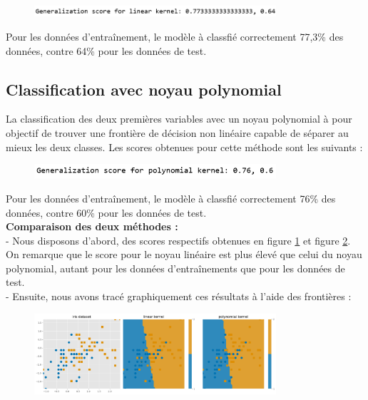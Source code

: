 \documentclass[a4paper,12pt]{article}
\begin{document}
\begin{figure}[h!]
    \centering
    \includegraphics[width=0.8\textwidth]{Images/linear_score.png}
    \caption{}
    \label{fig:linear}
\end{figure}

Pour les données d'entraînement, le modèle à classfié correctement 77,3\% des données, contre 64\% pour les données de test. 


\subsection{Classification avec noyau polynomial}

La classification des deux premières variables avec un noyau polynomial à pour objectif de trouver une frontière de décision non linéaire capable de séparer au mieux les deux classes. 
Les scores obtenues pour cette méthode sont les suivants :

\begin{figure}[h!]
    \centering
    \includegraphics[width=0.8\textwidth]{Images/poly_score.png}
    \caption{}
    \label{fig:poly}
\end{figure}

Pour les données d'entraînement, le modèle à classfié correctement 76\% des données, contre 60\% pour les données de test. \\

\textbf{Comparaison des deux méthodes :}\\[0.5cm]
- Nous disposons d'abord, des scores respectifs obtenues en figure \ref{fig:linear} et figure \ref{fig:poly}.
On remarque que le score pour le noyau linéaire est plus élevé que celui du noyau polynomial, autant pour les données d'entraînements que pour les données de test.\\

- Ensuite, nous avons tracé graphiquement ces résultats à l'aide des frontières : 
\begin{figure}[h!]
    \centering
    \includegraphics[width=0.8\textwidth]{Images/linear_vs_poly.png}
    \caption{}
\end{figure}
\end{document}

